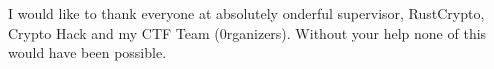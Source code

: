 I would like to thank everyone at absolutely onderful supervisor,
RustCrypto, Crypto Hack and my CTF Team (0rganizers).
Without your help none of this would have been possible.
